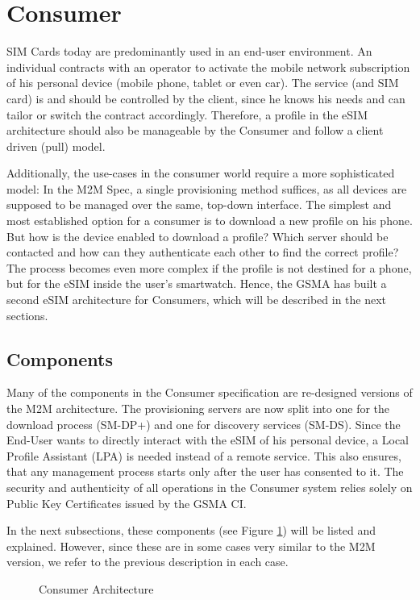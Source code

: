 \section{Consumer}
SIM Cards today are predominantly used in an end-user environment. An individual contracts with an operator to activate the mobile network subscription of his personal device (mobile phone, tablet or even car). The service (and SIM card) is and should be controlled by the client, since he knows his needs and can tailor or switch the contract accordingly. Therefore, a profile in the eSIM architecture should also be manageable by the Consumer and follow a client driven (pull) model.

Additionally, the use-cases in the consumer world require a more sophisticated model: In the M2M Spec, a single provisioning method suffices, as all devices are supposed to be managed over the same, top-down interface. The simplest and most established option for a consumer is to download a new profile on his phone. But how is the device enabled to download a profile? Which server should be contacted and how can they authenticate each other to find the correct profile? The process becomes even more complex if the profile is not destined for a phone, but for the eSIM inside the user's smartwatch. Hence, the GSMA has built a second eSIM architecture for Consumers, which will be described in the next sections.

\subsection{Components}
Many of the components in the Consumer specification \parencite{SGP:21} are re-designed versions of the M2M architecture. The provisioning servers are now split into one for the download process (SM-DP+) and one for discovery services (SM-DS). Since the End-User wants to directly interact with the eSIM of his personal device, a Local Profile Assistant (\acrshort{LPA}) is needed instead of a remote service. This also ensures, that any management process starts only after the user has consented to it.
The security and authenticity of all operations in the Consumer system relies solely on Public Key Certificates issued by the GSMA CI.

In the next subsections, these components (see Figure \ref{fig:con_arch}) will be listed and explained. However, since these are in some cases very similar to the M2M version, we refer to the previous description in each case.

\begin{figure}[ht]
    \centering
    
    \caption{Consumer Architecture}
    \label{fig:con_arch}
\end{figure}

